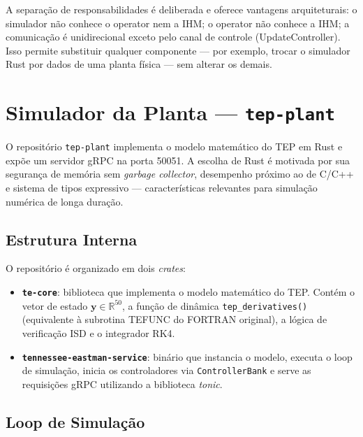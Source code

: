 
A separação de responsabilidades é deliberada e oferece vantagens arquiteturais: o simulador não conhece o operator nem a IHM; o operator não conhece a IHM; a comunicação é unidirecional exceto pelo canal de controle (UpdateController). Isso permite substituir qualquer componente — por exemplo, trocar o simulador Rust por dados de uma planta física — sem alterar os demais.

\section{Simulador da Planta — \texttt{tep-plant}}
\label{sec:plant}

O repositório \texttt{tep-plant} implementa o modelo matemático do TEP em Rust e expõe um servidor gRPC na porta 50051. A escolha de Rust é motivada por sua segurança de memória sem \textit{garbage collector}, desempenho próximo ao de C/C++ e sistema de tipos expressivo — características relevantes para simulação numérica de longa duração.

\subsection{Estrutura Interna}

O repositório é organizado em dois \textit{crates}:

\begin{itemize}
  \item \textbf{\texttt{te-core}}: biblioteca que implementa o modelo matemático do TEP. Contém o vetor de estado $\mathbf{y} \in \mathbb{R}^{50}$, a função de dinâmica \texttt{tep\_derivatives()} (equivalente à subrotina TEFUNC do FORTRAN original), a lógica de verificação ISD e o integrador RK4.
  \item \textbf{\texttt{tennessee-eastman-service}}: binário que instancia o modelo, executa o loop de simulação, inicia os controladores via \texttt{ControllerBank} e serve as requisições gRPC utilizando a biblioteca \textit{tonic}.
\end{itemize}

\subsection{Loop de Simulação}

